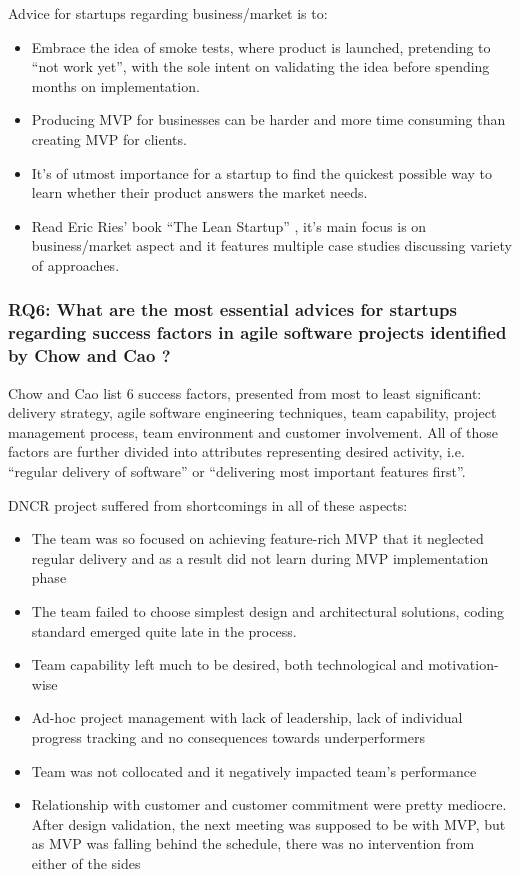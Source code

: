 \documentclass{article}
\begin{document}
Advice for startups regarding business/market is to:
\begin{itemize}
\item Embrace the idea of smoke tests, where product is launched, pretending to ``not work yet'', with the sole intent on validating the idea before spending months on implementation.
\item Producing MVP for businesses can be harder and more time consuming than creating MVP for clients.
\item It's of utmost importance for a startup to find the quickest possible way to learn whether their product answers the market needs.
\item Read Eric Ries' book ``The Lean Startup'' \cite{ries2011lean}, it's main focus is on business/market aspect and it features multiple case studies discussing variety of approaches.
\end{itemize}

\subsubsection{RQ6: What are the most essential advices for startups regarding success factors in agile software projects identified by Chow and Cao \cite{cao2008agile}?}
Chow and Cao list 6 success factors, presented from most to least significant: delivery strategy, agile software engineering techniques, team capability, project management process, team environment and customer involvement. All of those factors are further divided into attributes representing desired activity, i.e. ``regular delivery of software'' or ``delivering most important features first''.

DNCR project suffered from shortcomings in all of these aspects:
\begin{itemize}
\item The team was so focused on achieving feature-rich MVP that it neglected regular delivery and as a result did not learn during MVP implementation phase
\item The team failed to choose simplest design and architectural solutions, coding standard emerged quite late in the process.
\item Team capability left much to be desired, both technological and motivation-wise
\item Ad-hoc project management with lack of leadership, lack of individual progress tracking and no consequences towards underperformers
\item Team was not collocated and it negatively impacted team's performance
\item Relationship with customer and customer commitment were pretty mediocre. After design validation, the next meeting was supposed to be with MVP, but as MVP was falling behind the schedule, there was no intervention from either of the sides
\end{itemize}
\end{document}
